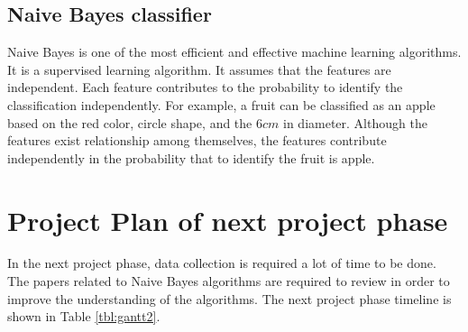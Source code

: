 \subsection{Naive Bayes classifier}
Naive Bayes is one of the most efficient and effective machine learning algorithms. It is a supervised learning algorithm. It assumes that the features are independent. Each feature contributes to the probability to identify the classification independently. For example, a fruit can be classified as an apple based on the red color, circle shape, and the $6cm$ in diameter. Although the features exist relationship among themselves, the features contribute independently in the probability that to identify the fruit is apple\cite{sunil:2015}. 

\section{Project Plan of next project phase}
In the next project phase, data collection is required a lot of time to be done. The papers related to Naive Bayes algorithms are required to review in order to improve the understanding of the algorithms. The next project phase timeline is shown in Table \ref{tbl:gantt2}.


